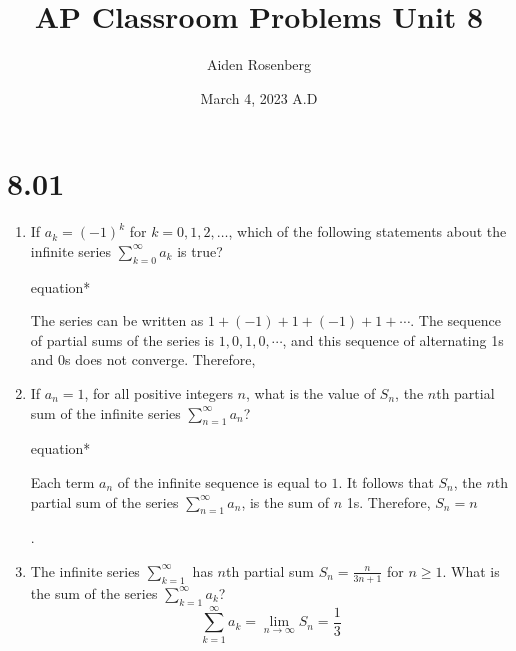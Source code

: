 \documentclass[12pt]{article}
\title{AP Classroom Problems Unit 8}
\author{Aiden Rosenberg}
\date{March 4, 2023 A.D}
\begin{document}
\maketitle
\section*{8.01}
\begin{enumerate}
	\item If $a_k=(-1)^k$ for $k=0,1,2,\dots $, which of the following statements about the infinite series $\sum_{k=0}^{\infty} a_k$ is true?
	\begin{empheq}[box=\tcbhighmath]{equation*}
		\parbox{5in}{The series can be written as $1+(-1)+1+(-1)+1+\cdots$. The sequence of partial sums of the series is $1,0,1,0,\cdots$, and this sequence of alternating 1s and 0s does not converge. Therefore, }
	\end{empheq}
	

	\item If $a_n=1$, for all positive integers $n$, what is the value of $S_n$, the $n$th partial sum of the infinite series $\sum_{n=1}^{\infty} a_n$? \\
	\begin{empheq}[box=\tcbhighmath]{equation*}
			\parbox{5in}{Each term $a_n$ of the infinite sequence is equal to $1$. It follows that $S_n$, the $n$th partial sum of the series $\sum_{n=1}^{\infty} a_n$, is the sum of $n$ 1s. Therefore, $\boxed{S_n=n}$}.
	\end{empheq}

	\item The infinite series $\sum_{k=1}^{\infty}$ has $n$th partial sum $S_n = \frac{n}{3n+1}$ for $n\geq1$. What is the sum of the series $\sum_{k=1}^{\infty}a_k$?
	$$\sum_{k=1}^{\infty}a_k = \lim_{n\to\infty} S_n = \boxed{\frac{1}{3}}$$
\end{enumerate}
\end{document}
